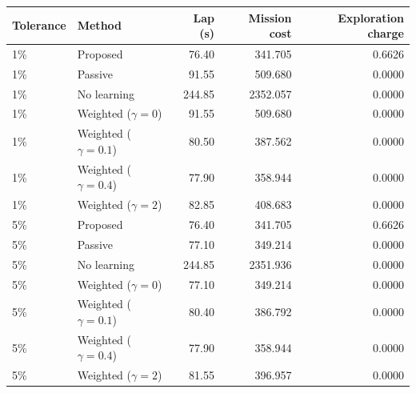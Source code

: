 \begin{tabular}{llrrr}
\toprule
Tolerance & Method & Lap (s) & Mission cost & Exploration charge \\
\midrule
1\% & Proposed & 76.40 & 341.705 & 0.6626 \\
1\% & Passive & 91.55 & 509.680 & 0.0000 \\
1\% & No learning & 244.85 & 2352.057 & 0.0000 \\
1\% & Weighted ($\gamma=0$) & 91.55 & 509.680 & 0.0000 \\
1\% & Weighted ($\gamma=0.1$) & 80.50 & 387.562 & 0.0000 \\
1\% & Weighted ($\gamma=0.4$) & 77.90 & 358.944 & 0.0000 \\
1\% & Weighted ($\gamma=2$) & 82.85 & 408.683 & 0.0000 \\
5\% & Proposed & 76.40 & 341.705 & 0.6626 \\
5\% & Passive & 77.10 & 349.214 & 0.0000 \\
5\% & No learning & 244.85 & 2351.936 & 0.0000 \\
5\% & Weighted ($\gamma=0$) & 77.10 & 349.214 & 0.0000 \\
5\% & Weighted ($\gamma=0.1$) & 80.40 & 386.792 & 0.0000 \\
5\% & Weighted ($\gamma=0.4$) & 77.90 & 358.944 & 0.0000 \\
5\% & Weighted ($\gamma=2$) & 81.55 & 396.957 & 0.0000 \\
\bottomrule
\end{tabular}

